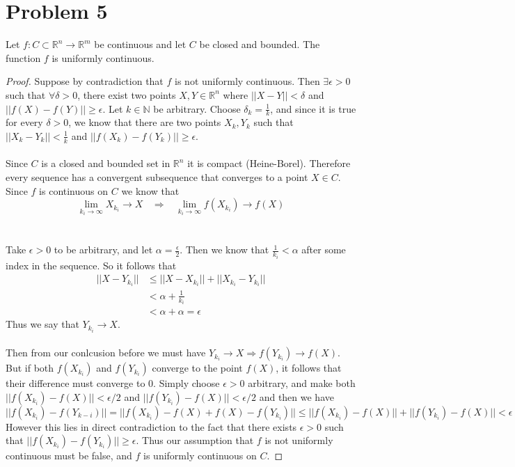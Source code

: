 \documentclass{article}
\theoremstyle{definition}
\begin{document}
\section*{Problem 5}
\begin{mdframed}
    Let $f:C\subset \mathbb{R}^n \rightarrow \mathbb{R}^m$ be continuous and let $C$ be closed and bounded. The function $f$ is uniformly continuous.
\end{mdframed}
\begin{proof}
    Suppose by contradiction that $f$ is not uniformly continuous.  Then $\exists \epsilon > 0$ such that $\forall \delta > 0$, there 
    exist two points $X,Y\in \mathbb{R}^n$ where $||X-Y||<\delta $ and $||f(X) -f(Y)||\geqslant \epsilon$. Let $k \in \mathbb{N}$ be arbitrary.
    Choose $\delta_k = \frac{1}{k}$, and since it is true for every $\delta > 0$, we know that there are two points $X_k, Y_k$ such that 
    $||X_k - Y_k||< \frac{1}{k}$ and $||f(X_k) -f(Y_k)||\geqslant \epsilon$. \\\\
    Since $C$ is a closed and bounded set in $\mathbb{R}^n$ it is compact (Heine-Borel). Therefore every sequence has a convergent subsequence that converges to a point $X \in C$.
    Since $f$ is continuous on $C$ we know that 
    \[
        \lim_{k_i \rightarrow \infty} X_{k_i} \rightarrow X \ \ \ \ \Longrightarrow \ \ \ \ \lim_{k_i \rightarrow \infty}f(X_{k_i}) \rightarrow f(X)
    \]\\\\
    Take $\epsilon > 0$ to be arbitrary, and let $\alpha = \frac{\epsilon}{2}$. Then we know that $ \frac{1}{k_i} < \alpha$ after some index in the sequence.
    So it follows that 
    \begin{align*}
        ||X-Y_{k_i}|| &\leqslant ||X-X_{k_i}|| + ||X_{k_i} - Y_{k_i}|| \\
        &< \alpha + \frac{1}{k_i} \\
        &< \alpha + \alpha = \epsilon
    \end{align*}
    Thus we say that $Y_{k_i}\rightarrow X$.\\\\
    Then from our conlcusion before we must have $Y_{k_i}\rightarrow X \Longrightarrow f(Y_{k_i}) \rightarrow f(X)$.
    But if both $f(X_{k_i})$ and $f(Y_{k_i})$ converge to the point $f(X)$, it follows that their difference must converge to 0. Simply choose $\epsilon > 0$ arbitrary,
    and make both $||f(X_{k_i}) - f(X)|| <\epsilon / 2$ and $||f(Y_{k_i}) - f(X)||<\epsilon/2$ and then we have 
    \[
        ||f(X_{k_i}) - f(Y_{k-i})|| = ||f(X_{k_i}) - f(X) + f(X) - f(Y_{k_i}) || \leqslant ||f(X_{k_i}) - f(X)|| + ||f(Y_{k_i}) - f(X)|| < \epsilon
    \]
    However this lies in direct contradiction to the fact that there exists $\epsilon > 0$ such that $||f(X_{k_i}) - f(Y_{k_i})||\geqslant \epsilon$.
    Thus our assumption that $f$ is not uniformly continuous must be false, and $f$ is uniformly continuous on $C$.
\end{proof}
\end{document}
